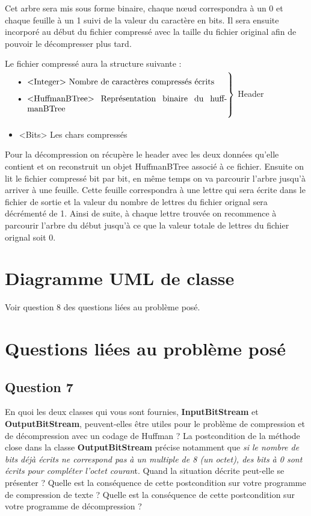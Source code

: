 \documentclass[11pt]{article}
\begin{document}
Cet arbre sera mis sous forme binaire, chaque nœud correspondra à un 0 et chaque feuille à un 1 suivi de la valeur du caractère en bits. Il sera ensuite incorporé au début du fichier compressé avec la taille du fichier original afin de pouvoir le décompresser plus tard.

Le fichier compressé aura la structure suivante : \\
$\left. \text{\parbox{0.76\linewidth}{
\begin{itemize}
\item <Integer> Nombre de caractères compressés écrits
\item <HuffmanBTree> Représentation binaire du huffmanBTree
\end{itemize}
}} \right \}$ Header 
\begin{itemize}
\item <Bits> Les chars compressés \\
\end{itemize} 

Pour la décompression on récupère le header avec les deux données qu'elle contient et on reconstruit un objet HuffmanBTree associé à ce fichier. Ensuite on lit le fichier compressé bit par bit, en même temps on va parcourir l'arbre jusqu'à arriver à une feuille. Cette feuille correspondra à une lettre qui sera écrite dans le fichier de sortie et la valeur du nombre de lettres du fichier orignal sera décrémenté de 1. Ainsi de suite, à chaque lettre trouvée on recommence à parcourir l'arbre du début jusqu'à ce que la valeur totale de lettres du fichier orignal soit 0.


\section{Diagramme UML de classe}
Voir question 8 des questions liées au problème posé.

\section{Questions liées au problème posé}

\subsection*{Question 7}
En quoi les deux classes qui vous sont fournies, \textbf{InputBitStream} et \textbf{OutputBitStream}, peuvent-elles être utiles pour le problème de compression et de décompression avec un codage de Huffman ?
La postcondition de la méthode close dans la classe \textbf{OutputBitStream} précise notamment que \textit{si le nombre de bits déjà écrits ne correspond pas à un multiple de 8 (un octet), des bits à 0 sont écrits pour compléter l’octet couran}t. Quand la situation décrite peut-elle se présenter ? Quelle est la conséquence de cette postcondition sur votre programme de compression de texte ? Quelle est la conséquence de cette postcondition sur votre programme de décompression ? \\
\end{document}
